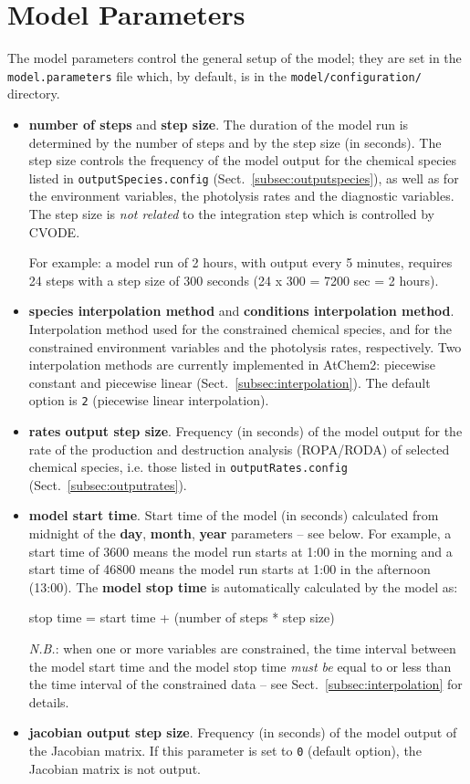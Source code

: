\section{Model Parameters} \label{sec:model-parameters}

The model parameters control the general setup of the model; they are
set in the \texttt{model.parameters} file which, by default, is
in the \texttt{model/configuration/} directory.

\begin{itemize}
\item \textbf{number of steps} and \textbf{step size}. The duration of
  the model run is determined by the number of steps and by the step
  size (in seconds). The step size controls the frequency of the model
  output for the chemical species listed in \texttt{outputSpecies.config}
  (Sect.~\ref{subsec:outputspecies}), as well as for the environment
  variables, the photolysis rates and the diagnostic variables. The
  step size is \emph{not related} to the integration step which is
  controlled by CVODE.

  For example: a model run of 2 hours, with output every 5 minutes,
  requires 24 steps with a step size of 300 seconds (24 x 300 = 7200
  sec = 2 hours).
\item \textbf{species interpolation method} and
  \textbf{conditions interpolation method}. Interpolation method used
  for the constrained chemical species, and for the constrained
  environment variables and the photolysis rates, respectively. Two
  interpolation methods are currently implemented in AtChem2:
  piecewise constant and piecewise linear (Sect.~\ref{subsec:interpolation}).
  The default option is \texttt{2} (piecewise linear interpolation).
\item \textbf{rates output step size}. Frequency (in seconds) of the
  model output for the rate of the production and destruction analysis
  (ROPA/RODA) of selected chemical species, i.e. those listed in
  \texttt{outputRates.config} (Sect.~\ref{subsec:outputrates}).
\item \textbf{model start time}. Start time of the model (in seconds)
  calculated from midnight of the \textbf{day}, \textbf{month},
  \textbf{year} parameters -- see below. For example, a start time of
  3600 means the model run starts at 1:00 in the morning and a start
  time of 46800 means the model run starts at 1:00 in the afternoon
  (13:00). The \textbf{model stop time} is automatically calculated by
  the model as:
  \begin{center}
  stop time = start time + (number of steps * step size)
  \end{center}
  \emph{N.B.}: when one or more variables are constrained, the time
  interval between the model start time and the model stop time
  \emph{must be} equal to or less than the time interval of the
  constrained data -- see Sect.~\ref{subsec:interpolation} for details.
\item \textbf{jacobian output step size}. Frequency (in seconds) of
  the model output of the Jacobian matrix. If this parameter is set to
  \texttt{0} (default option), the Jacobian matrix is not output.


\end{itemize}
